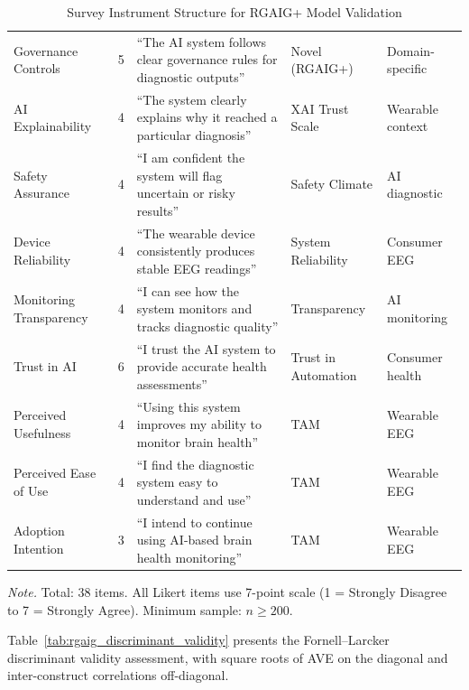 \begingroup\singlespacing\tablefontsize\tablestripes
\begin{xltabular}{\textwidth}{@{} l c X l l @{}}
\caption{Survey Instrument Structure for RGAIG+ Model Validation}
\label{tab:rgaig_survey_instrument}\\
\toprule
{} &  &  &  &  \\
\midrule
\endfirsthead
\endhead
\bottomrule
\endlastfoot
Governance Controls & 5 & ``The AI system follows clear governance rules for diagnostic outputs'' & Novel (RGAIG+) & Domain-specific \\
\addlinespace
AI Explainability & 4 & ``The system clearly explains why it reached a particular diagnosis'' & XAI Trust Scale & Wearable context \\
\addlinespace
Safety Assurance & 4 & ``I am confident the system will flag uncertain or risky results'' & Safety Climate & AI diagnostic \\
\addlinespace
Device Reliability & 4 & ``The wearable device consistently produces stable EEG readings'' & System Reliability & Consumer EEG \\
\addlinespace
Monitoring Transparency & 4 & ``I can see how the system monitors and tracks diagnostic quality'' & Transparency & AI monitoring \\
\addlinespace
Trust in AI & 6 & ``I trust the AI system to provide accurate health assessments'' & Trust in Automation & Consumer health \\
\addlinespace
Perceived Usefulness & 4 & ``Using this system improves my ability to monitor brain health'' & TAM \citep{davis1989tam} & Wearable EEG \\
\addlinespace
Perceived Ease of Use & 4 & ``I find the diagnostic system easy to understand and use'' & TAM \citep{davis1989tam} & Wearable EEG \\
\addlinespace
Adoption Intention & 3 & ``I intend to continue using AI-based brain health monitoring'' & TAM \citep{davis1989tam} & Wearable EEG \\
\end{xltabular}
\par\smallskip\noindent\textit{Note.} Total: 38 items. All Likert items use 7-point scale (1 = Strongly Disagree to 7 = Strongly Agree). Minimum sample: $n \geq 200$.
\endgroup

Table~\ref{tab:rgaig_discriminant_validity} presents the Fornell--Larcker discriminant validity assessment, with square roots of AVE on the diagonal and inter-construct correlations off-diagonal.

